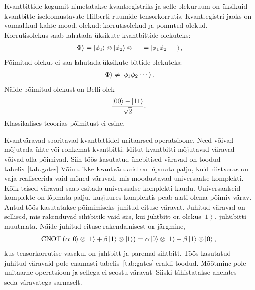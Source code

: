 \documentclass[12pt]{report}
\def\paren#1{\left(#1\right)}
\def\ket#1{\left|#1\right>}
\def\CNOT{\mathop{\rm CNOT}\nolimits}
\begin{document}
Kvantbittide kogumit nimetatakse kvantregistriks ja selle olekuruum on üksikuid kvantbitte iseloomustavate Hilberti ruumide tensorkorrutis.
Kvantregistri jaoks on võimalikud kahte moodi olekud: korrutisolekud ja põimitud olekud.
Korrutisolekus saab lahutada üksikute kvantbittide olekuteks:
\begin{align}
    \ket{\Phi}
    = \ket{\phi_1} \otimes \ket{\phi_2} \otimes \cdots
    = \ket{\phi_1 \phi_2 \cdots} \rlap{,}
\end{align}
Põimitud olekut ei saa lahutada üksikute bittide olekuteks:
\begin{align}
    \ket{\Phi}
    \ne \ket{\phi_1 \phi_2 \cdots} \rlap{,}
\end{align}
Näide põimitud olekust on Belli olek
\begin{align}
    \frac{\ket{00} + \ket{11}}{\sqrt 2} \rlap{.}
\end{align}
Klassikalises teoorias põimitust ei esine.

Kvantväravad sooritavad kvantbittidel unitaarsed operatsioone.
Need võivad mõjutada ühte või rohkemat kvantbitti.
Mitut kvantbitti mõjutavad väravad võivad olla põimivad.
Siin töös kasutatud ühebitised väravad on toodud tabelis~\ref{tab:gates}
Võimalikke kvantväravaid on lõpmata palju, kuid riistvaras on vaja realiseerida vaid mõned väravad, mis moodustavad universaalse komplekti.
Kõik teised väravad saab esitada universaalse komplekti kaudu.
Universaalseid komplekte on lõpmata palju, kusjuures komplektis peab alati olema põimiv värav.
Antud töös kasutatakse põimimiseks juhitud eituse väravat.
Juhitud väravad on sellised, mis rakenduvad sihtbitile vaid siis, kui juhtbitt on olekus \(\ket1\), juhtibitti muutmata.
Näide juhitud eituse rakendamisest on järgmine,
\begin{align}
    \CNOT \paren{\alpha \ket{0} \otimes \ket{1} + \beta \ket{1} \otimes \ket{1}}
    = \alpha \ket{0} \otimes \ket{1} + \beta \ket{1} \otimes \ket{0} \rlap{,}
\end{align}
kus tensorkorrutise vasakul on juhtbitt ja paremal sihtbitt.
Töös kasutatud juhitud väravaid pole enamasti tabelis~\ref{tab:gates} eraldi toodud.
Mõõtmine pole unitaarne operatsioon ja sellega ei seostu väravat.
Siiski tähistatakse ahelates seda väravatega sarnaselt.
\end{document}
